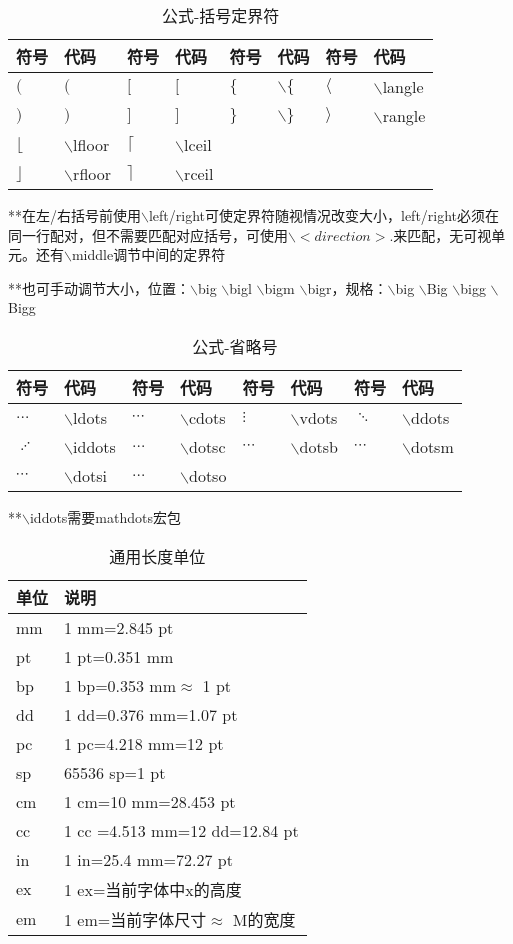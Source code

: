 \documentclass[UTF8,fontset=ubuntu]{ctexart}
\begin{document}
\begin{table}
\begin{tabular}{l l l l l l l l}
	\hline
	符号 & 代码 & 符号 & 代码 & 符号 & 代码 & 符号 & 代码\\
	\hline
	$($ & $($ & $[$ & $[$ & $\{$ & $\backslash\{$ & $\langle$ & $\backslash$langle\\
	$)$ & $)$ & $]$ & $]$ & $\}$ & $\backslash\}$ & $\rangle$ & $\backslash$rangle\\
	$\lfloor$ & $\backslash$lfloor & $\lceil$ & $\backslash$lceil\\
	$\rfloor$ & $\backslash$rfloor & $\rceil$ & $\backslash$rceil\\
	\hline
\end{tabular}\par
**在左/右括号前使用$\backslash$left/right可使定界符随视情况改变大小，left/right必须在同一行配对，但不需要匹配对应括号，可使用$\backslash<direction>$.来匹配，无可视单元。还有$\backslash$middle调节中间的定界符\par
**也可手动调节大小，位置：$\backslash$big $\backslash$bigl $\backslash$bigm $\backslash$bigr，规格：$\backslash$big $\backslash$Big $\backslash$bigg $\backslash$Bigg
\caption{公式-括号定界符}
\end{table}
\begin{table}
\begin{tabular}{l l l l l l l l}
	\hline
	符号 & 代码 & 符号 & 代码 & 符号 & 代码 & 符号 & 代码\\
	\hline
	$\ldots$ & $\backslash$ldots & $\cdots$ & $\backslash$cdots & $\vdots$ & $\backslash$vdots & $\ddots$ & $\backslash$ddots\\
	$\iddots$ & $\backslash$iddots & $\dotsc$ & $\backslash$dotsc & $\dotsb$ & $\backslash$dotsb & $\dotsm$ & $\backslash$dotsm\\
	$\dotsi$ & $\backslash$dotsi & $\dotso$ & $\backslash$dotso\\
	\hline
\end{tabular}
**$\backslash$iddots需要mathdots宏包
\caption{公式-省略号}
\end{table}
\begin{table}
\begin{tabular}{l l}
	\hline
	单位 & 说明\\
	\hline
	mm & 1 mm=2.845 pt\\
	pt & 1 pt=0.351 mm\\
	bp & 1 bp=0.353 mm$\approx$ 1 pt\\
	dd & 1 dd=0.376 mm=1.07 pt\\
	pc & 1 pc=4.218 mm=12 pt\\
	sp & 65536 sp=1 pt\\
	cm & 1 cm=10 mm=28.453 pt\\
	cc & 1 cc =4.513 mm=12 dd=12.84 pt\\
	in & 1 in=25.4 mm=72.27 pt\\
	ex & 1 ex=当前字体中x的高度\\
	em & 1 em=当前字体尺寸$\approx$ M的宽度\\
	\hline
\end{tabular}
\caption{通用长度单位}
\end{table}
\end{document}
